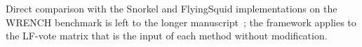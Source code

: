 Direct comparison with the Snorkel and FlyingSquid implementations
on the WRENCH benchmark \citep{ratner2017snorkel,fu2020fast,
zhang2021wrench} is left to the longer
manuscript~\citep{towell2026weaksupcoarseningextended}; the framework applies
to the LF-vote matrix that is the input of each method without
modification.
